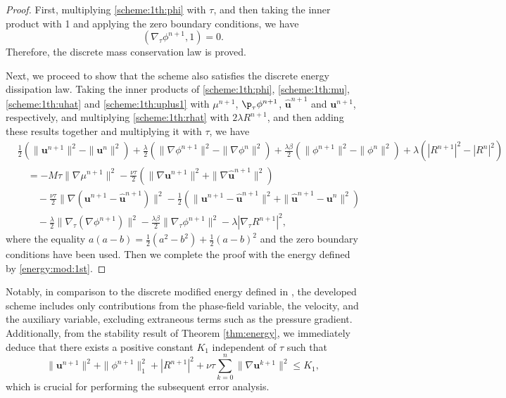 \begin{proof}
	First, multiplying  \eqref{scheme:1th:phi} with $\tau$, and then taking the inner product with 1 and applying the zero boundary conditions, we have
	\begin{equation*}
		(\nabla_\tau  \phi^{n+1},1)=0.  
	\end{equation*}
	Therefore, the discrete mass conservation law is proved.
	
	Next, we proceed to show that the scheme also satisfies the discrete energy dissipation law.
	Taking the inner products of \eqref{scheme:1th:phi}, \eqref{scheme:1th:mu}, \eqref{scheme:1th:uhat} and \eqref{scheme:1th:uplus1} with $\mu^{n+1}$, $\p_\tau \phi^{n+1}$, $ \widehat {\bm u}^{n+1}$ and $ \bm u^{n+1}$, respectively, and multiplying \eqref{scheme:1th:rhat} with $2\lambda  R^{n+1}$, and then adding these results together
	and multiplying it with $\tau$, we have
	\begin{equation*}
		\begin{aligned}
			& \frac{1}{2}(\| \bm u^{n+1}\|^2-\| \bm u^{n}\|^2) + \frac{\lambda}{2}(\|\nabla \phi^{n+1}\|^2- \|\nabla \phi^n\|^2 ) +\frac{\lambda \beta}{2}(\|\phi^{n+1}\|^2- \|\phi^n\|^2 ) + \lambda (| R^{n+1}|^2-|R^n|^2) \\
			&\quad = -M\tau\|\nabla \mu^{n+1}\|^2 - \frac{\nu \tau}{2}(\|\nabla  \bm u^{n+1} \|^2+\|\nabla \widehat {\bm u}^{n+1} \|^2)\\
			& \qquad - \frac{\nu \tau}{2} \|\nabla  (\bm u^{n+1}- \widehat {\bm u}^{n+1})\|^2 - \frac{1}{2}(\|\bm u^{n+1}- \widehat {\bm u}^{n+1}\|^2+\|\widehat {\bm u}^{n+1}- \bm u^n\|^2) \\
			& \qquad -\frac{\lambda}{2}\|\nabla_\tau  (\nabla \phi^{n+1})\|^2 -\frac{\lambda \beta}{2}\|\nabla_\tau  \phi^{n+1}\|^2-\lambda |\nabla_\tau R^{n+1}|^2,
		\end{aligned}
	\end{equation*}
	where  the equality $a(a-b)=\frac{1}{2}(a^2-b^2)+\frac{1}{2}(a-b)^2$  and the zero boundary conditions have been used. Then we complete the proof with the energy defined by \eqref{energy:mod:1st}.
\end{proof}

\begin{remark} \label{err:energy_estimate}
	Notably, in comparison to the discrete modified energy defined in \cite{li2022fully, qian2023fully, li2023consistency, xu2020error}, the developed scheme includes only contributions from the phase-field variable, the velocity, and the auxiliary variable, excluding extraneous terms such as the pressure gradient. 
	Additionally, from the stability result of Theorem \ref{thm:energy},  we immediately deduce that  there exists a positive constant $K_1$ independent of $\tau$ such that
	\begin{equation} \label{bound:solu}
		\|\bm u^{n+1}\|^2 +\|\phi^{n+1}\|_1^2 +|R^{n+1}|^2  +   {\nu \tau\sum_{k=0}^n\|\nabla {\bm u}^{k+1} \|^2}\leq K_1,
	\end{equation}
	which is crucial for performing the subsequent error analysis.
\end{remark}


